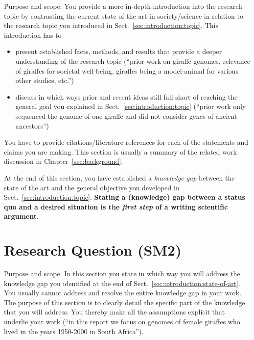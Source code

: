 \documentclass[12pt,a4paper,footinclude=true,twoside,headinclude=true]{report}
\begin{document}
\textsf{Purpose and scope}. You provide a more in-depth introduction into the research topic by contrasting the current state of the art in society/science in relation to the research topic you introduced in Sect.~\ref{sec:introduction:topic}. This introduction has to 

\begin{itemize}
    \item present established facts, methods, and results that provide a deeper  understanding of the research topic (``prior work on giraffe genomes, relevance of giraffes for societal well-being, giraffes being a model-animal for various other studies, etc.'')
    \item discuss in which ways prior and recent ideas still fall short of reaching the general goal you explained in Sect.~\ref{sec:introduction:topic} (``prior work only sequenced the genome of one giraffe and did not consider genes of ancient ancestors'')
\end{itemize}

You have to provide citations/literature references for each of the statements and claims you are making. This section is usually a summary of the related work discussion in Chapter~\ref{sec:background}.

At the end of this section, you have established a \emph{knowledge gap} between the state of the art and the general objective you developed in Sect.~\ref{sec:introduction:topic}. \textbf{Stating a (knowledge) gap between a status quo and a desired situation is the \emph{first step} of a writing scientific argument.} 


\section{Research Question (SM2)}\label{sec:introduction:research-question}

\textsf{Purpose and scope}. In this section you state in which way you will address the knowledge gap you identified at the end of Sect.~\ref{sec:introduction:state-of-art}. You usually cannot address and resolve the entire knowledge gap in your work. The purpose of this section is to clearly detail the specific part of the knowledge that you will address. You thereby make all the assumptions explicit that underlie your work (``in this report we focus on genomes of female giraffes who lived in the years 1950-2000 in South Africa'').
\end{document}
